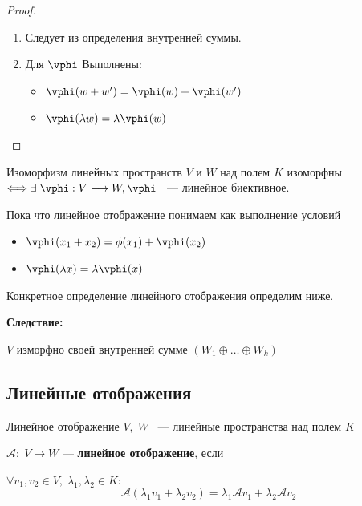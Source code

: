 \begin{proof}
    \begin{enumerate}
        \item Следует из определения внутренней суммы.
        \item Для $\vphi$ Выполнены:
            \begin{itemize}
                \item $\vphi(w + w') = \vphi(w) + \vphi(w')$
                \item $\vphi(\lambda w) = \lambda \vphi(w)$
            \end{itemize}
    \end{enumerate}
    
\end{proof}

\begin{Definition}{Изоморфизм линейных пространств}{}
    $V$ и $W$ над полем $K$ изоморфны $\Longleftrightarrow \exists \; \vphi : V \longrightarrow W , \vphi $ \; ~--- линейное биективное.
\end{Definition}

\begin{remark}
    Пока что линейное отображение понимаем как выполнение условий
    \begin{itemize}
        \item $\vphi(x_1 + x_2) = \phi(x_1) + \vphi(x_2)$
        \item $\vphi(\lambda x) = \lambda \vphi(x)$
    \end{itemize}
    Конкретное определение линейного отображения определим ниже.
\end{remark}

\vspace{1\baselineskip}

\textbf{Следствие:}

$V$ изморфно своей внутренней сумме $\left(W_1 \oplus \ldots \oplus W_k \right)$


\subsection{Линейные отображения}

\begin{Definition}{Линейное отображение}{}
    $V, \; W$ ~--- линейные пространства над полем $K$

    $\mathcal{A}: \; V \longrightarrow W $ --- \textbf{линейное отображение}, если 

    $\forall v_1, v_2 \in V, \; \lambda _1, \lambda _2 \in K$:
    \[
        \mathcal{A}(\lambda _1 v_1 + \lambda _2 v_2) = \lambda _1 \mathcal{A} v_1 + \lambda _2 \mathcal{A} v_2
    \]
\end{Definition}
\vspace{1\baselineskip}

